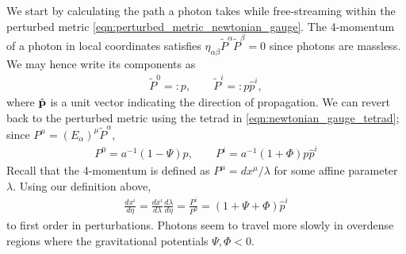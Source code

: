 We start by calculating the path a photon takes while free-streaming within the perturbed metric \eqref{eqn:perturbed_metric_newtonian_gauge}. The 4-momentum of a photon in local coordinates satisfies $\eta_{\alpha\beta}\tilde{P}^\alpha \tilde{P}^\beta = 0$ since photons are massless. We may hence write its components as
\begin{align}
	\tilde{P}^0 =: p, \qquad \tilde{P}^i =: p \hat{p}^i,
\end{align}
where $\hat{\mathbf{p}}$ is a unit vector indicating the direction of propagation. We can revert back to the perturbed metric using the tetrad in \eqref{eqn:newtonian_gauge_tetrad}; since $P^\mu = (E_\alpha)^\mu \tilde{P}^\alpha$,
\begin{align}
	P^0 = a^{-1} (1 - \Psi)p, \qquad P^i = a^{-1}(1 + \Phi) p \hat{p}^i  \label{eqn:perturbed_photon_four_momentum}
\end{align}
Recall that the 4-momentum is defined as $P^\mu = dx^\mu/\lambda$ for some affine parameter $\lambda$. Using our definition above,
\begin{align}
	\frac{dx^i}{d\eta} =  \frac{dx^i}{d\lambda} \frac{d\lambda}{d\eta} = \frac{P^i}{P^0} = (1+\Psi+\Phi)\hat{p}^i	\label{eqn:perturbed_photon_position_total_derivative}
\end{align}
to first order in perturbations. Photons seem to travel more slowly in overdense regions where the gravitational potentials $\Psi,\Phi<0$.

